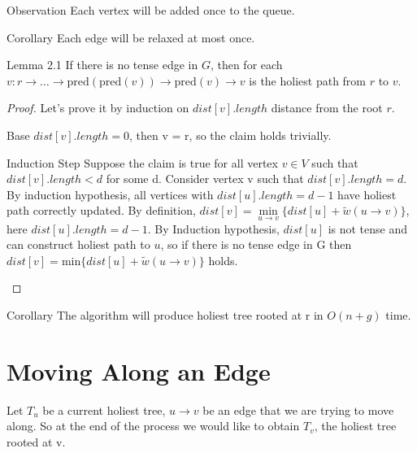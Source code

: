 \documentclass{article}
\begin{document}
\vspace{0.5cm}

\begin{oneshot}{Observation}
Each vertex will be added once to the queue.
\end{oneshot}

\begin{oneshot}{Corollary}
Each edge will be relaxed at most once.
\end{oneshot}

\begin{oneshot}{Lemma 2.1}
If there is no tense edge in $G$, then for each 
$v: r \rightarrow \ldots \rightarrow \text{pred}(\text{pred}(v)) \rightarrow 
\text{pred}(v) \rightarrow v$ is the holiest path from $r$ to $v$.
\end{oneshot}
\begin{proof}
Let's prove it by induction on $dist[v].length$ distance from the root
$r$.
\begin{oneshot}{Base}
$dist[v].length = 0$, then v = r, so the claim holds trivially.
\end{oneshot}

\begin{oneshot}{Induction Step}
Suppose the claim is true for all vertex $v \in V$ 
such that $dist[v].length < d$ for some d. Consider vertex v such that 
$dist[v].length=d$. By induction hypothesis, all vertices with 
$dist[u].length = d-1$ have holiest path 
correctly updated. By definition, $dist[v] = \min\limits_{u \rightarrow v}\{
dist[u] + \tilde w(u \rightarrow v)\}$, here $dist[u].length = d-1$. 
By Induction hypothesis, $dist[u]$ is not tense and can construct holiest 
path to $u$, so if there is no tense edge in G then 
$dist[v] = \text{min}\{dist[u] + \tilde w(u \rightarrow v)\}$ 
holds.
\end{oneshot}
\end{proof}

\begin{oneshot}{Corollary}
The algorithm will produce holiest tree rooted at r in $O(n + g)$ time.
\end{oneshot}

\section{Moving Along an Edge}

Let $T_u$ be a current holiest tree, $u \rightarrow v$ be an edge that we are
trying to move along. So at the end of the process we would like to obtain
$T_v$, the holiest tree rooted at v. \\
\end{document}

